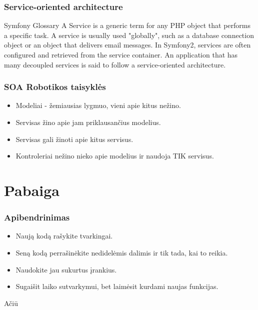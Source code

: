 \documentclass[12pt,a4paper]{beamer}
\begin{document}
\begin{frame}
    \frametitle{Service-oriented architecture}

    \begin{block}{Symfony Glossary}
        A Service is a generic term for any PHP object that performs a specific
        task. A service is usually used "globally", such as a database
        connection object or an object that delivers email messages. In
        Symfony2, services are often configured and retrieved from the service
        container. An application that has many decoupled services is said to
        follow a service-oriented architecture.
    \end{block}
\end{frame}
\begin{frame}
    \frametitle{SOA Robotikos taisyklės}
    \begin{itemize}
        \item Modeliai - žemiausias lygmuo, vieni apie kitus nežino.
        \item Servisas žino apie jam priklausančius modelius.
        \item Servisas gali žinoti apie kitus servisus.
        \item Kontroleriai nežino nieko apie modelius ir naudoja TIK servisus.
    \end{itemize}
\end{frame}

\section{Pabaiga}
\begin{frame}
    \frametitle{Apibendrinimas}

    \begin{itemize}
        \item Naują kodą rašykite tvarkingai.
        \item Seną kodą perrašinėkite nedidelėmis dalimis ir tik tada, kai to reikia.
        \item Naudokite jau sukurtus įrankius.
        \item Sugaišit laiko sutvarkymui, bet laimėsit kurdami naujas funkcijas.
    \end{itemize}
\end{frame}
\begin{frame}
	\begin{center}
        {\Huge Ačiū}
	\end{center}
\end{frame}
\end{document}
